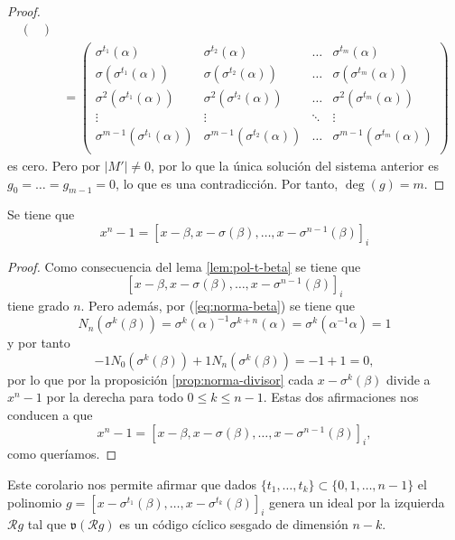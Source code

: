 \begin{proof}
\begin{align*}
\begin{pmatrix}
    \end{pmatrix}\\
      &= \begin{pmatrix}
        \sigma^{t_1}(\alpha) & \sigma^{t_2}(\alpha) & \dots & \sigma^{t_m}(\alpha)\\
        \sigma(\sigma^{t_1}(\alpha)) & \sigma(\sigma^{t_2}(\alpha)) & \dots &\sigma(\sigma^{t_m}(\alpha))\\
        \sigma^2(\sigma^{t_1}(\alpha)) & \sigma^2(\sigma^{t_2}(\alpha)) & \dots &\sigma^2(\sigma^{t_m}(\alpha))\\
        \vdots & \vdots & \ddots & \vdots \\
        \sigma^{m-1}(\sigma^{t_1}(\alpha)) & \sigma^{m-1}(\sigma^{t_2}(\alpha)) & \dots &\sigma^{m-1}(\sigma^{t_m}(\alpha))\\
      \end{pmatrix}
  \end{align*}
  es cero.
  Pero por \parencite[Lema 2.1]{gomez-torrecillas_petersongorensteinzierler_2018} \(|M'| \neq 0\), por lo que la única solución del sistema anterior es \(g_0 = \dots = g_{m-1} = 0\), lo que es una contradicción.
  Por tanto, \(\deg(g) = m\).
\end{proof}

\begin{corollary}
  Se tiene que
  \[
  x^n - 1 = \left[x - \beta, x - \sigma(\beta), \dots, x - \sigma^{n-1}(\beta)\right]_i
  \]
\end{corollary}

\begin{proof}
  Como consecuencia del lema \ref{lem:pol-t-beta} se tiene que 
  \[
    \left[x - \beta, x - \sigma(\beta), \dots, x - \sigma^{n-1}(\beta)\right]_i
  \]
  tiene grado \(n\).
  Pero además, por (\ref{eq:norma-beta}) se tiene que
  \[
  N_n(\sigma^k(\beta)) = \sigma^k(\alpha)^{-1}\sigma^{k+n}(\alpha) = \sigma^k(\alpha^{-1}\alpha) = 1
  \]
  y por tanto 
  \[
    -1N_0(\sigma^k(\beta)) + 1N_n(\sigma^k(\beta)) = -1 + 1 = 0,
  \]
  por lo que por la proposición \ref{prop:norma-divisor} cada \(x - \sigma^k(\beta)\) divide a \(x^n -1\) por la derecha para todo \(0 \leq k \leq n -1\).
  Estas dos afirmaciones nos conducen a que 
  \[
  x^n - 1 = \left[x - \beta, x - \sigma(\beta), \dots, x - \sigma^{n-1}(\beta)\right]_i,
  \]
  como queríamos. 
\end{proof}

Este corolario nos permite afirmar que dados \(\{t_1, \dots, t_k\} \subset \{0, 1, \dots, n - 1\}\) el polinomio \(g = [x - \sigma^{t_1}(\beta), \dots, x - \sigma^{t_k}(\beta)]_i\) genera un ideal por la izquierda \(\mathcal Rg\) tal que \(\mathfrak v(\mathcal Rg)\) es un código cíclico sesgado de dimensión \(n - k\).

